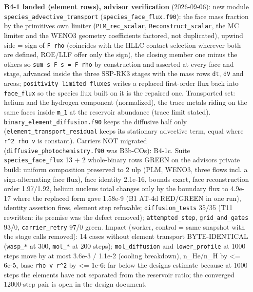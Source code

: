 \documentclass[english,a4paper]{my_memo}
\begin{document}
\begin{itemize}
  \textbf{B4-1 landed (element rows), advisor verification} (2026-09-06): new
  module \texttt{species\_advective\_transport} (\texttt{species\_face\_flux.f90}): the face
  mass fraction by the primitives\textquotesingle{} own limiter (\texttt{PLM\_rec\_scalar},
  \texttt{Reconstruct\_scalar}, the MC limiter and the WENO3 geometry coefficients
  factored, not duplicated), upwind side = sign of \texttt{F\_rho} (coincides with
  the HLLC contact selection wherever both are defined, ROE/LLF offer only
  the sign), the closing member one minus the others so
  \texttt{sum\_s\ F\_s\ =\ F\_rho} by construction and asserted at every face and stage,
  advanced inside the three SSP-RK3 stages with the mass row\textquotesingle s \texttt{dt}, \texttt{dV}
  and areas; \texttt{positivity\_limited\_fluxes} writes a replaced first-order flux
  back into \texttt{face\_flux} so the species flux built on it is the repaired one.
  Transported set: helium and the hydrogen component (normalized), the trace
  metals riding on the same faces inside \texttt{m\_1} at the reservoir abundance
  (trace limit stated). \texttt{binary\_element\_diffusion.f90} keeps the diffusive
  half only (\texttt{element\_transport\_residual} keeps its stationary advective
  term, equal where \texttt{r\^{}2\ rho\ v} is constant). Carriers NOT migrated
  (\texttt{diffusive\_photochemistry.f90} was B3b-CO\textquotesingle s): B4-1c. Suite
  \texttt{species\_face\_flux} 13 + 2 whole-binary rows GREEN on the advisor\textquotesingle s private
  build: uniform composition preserved to 2 ulp (PLM, WENO3, three flows
  incl. a sign-alternating face flux), face identity 2.1e-16, bounds exact,
  face reconstruction order 1.97/1.92, helium nucleus total changes only by
  the boundary flux to 4.9e-17 where the replaced form gave 1.58e-9 (B1
  AT-4d RED/GREEN in one run), identity assertion fires, element step
  refusable; \texttt{diffusion\_tests} 35/35 (T11 rewritten: its premise was the
  defect removed); \texttt{attempted\_step}, \texttt{grid\_and\_gates} 93/0, \texttt{carrier\_retry}
  97/0 green. Impact (worker, control = same snapshot with the stage calls
  removed): 14 cases without element transport BYTE-IDENTICAL (\texttt{wasp\_*} at
  300, \texttt{mol\_*} at 200 steps); \texttt{mol\_diffusion} and \texttt{lower\_profile} at 1000
  steps move by at most 3.6e-3 / 1.1e-2 (cooling breakdown), n\_He/n\_H by
  \textless= 6e-5, base \texttt{rho\ v\ r\^{}2} by \textless= 1e-6: far below the design\textquotesingle s estimate
  because at 1000 steps the elements have not separated from the reservoir
  ratio; the converged 12000-step pair is open in the design document.

\end{itemize}
\end{document}
